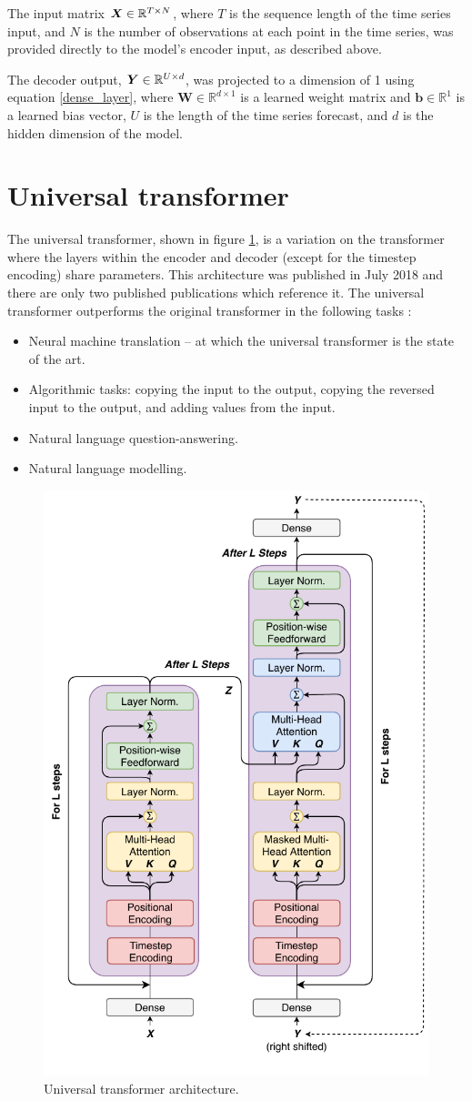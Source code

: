 The input matrix ${\bm{X}} \in \mathbb{R}^{T \times N}$, where $T$ is the sequence length of the time series input, and $N$ is the number of observations at each point in the time series, was provided directly to the model's encoder input, as described above.

The decoder output, ${\bm{Y}} \in \mathbb{R}^{U \times d}$, was projected to a dimension of 1 using equation \ref{dense_layer}, where $\boldsymbol{W} \in \mathbb{R}^{d \times 1}$ is a learned weight matrix and $\boldsymbol{b} \in \mathbb{R}^{1}$ is a learned bias vector, $U$ is the length of the time series forecast, and $d$ is the hidden dimension of the model.

\section{Universal transformer} \label{sec:universal_transformer}
The universal transformer, shown in figure \ref{fig:universal_transformer}, is a variation on the transformer where the layers within the encoder and decoder (except for the timestep encoding) share parameters.
This architecture was published in July 2018 \cite{Dehghani2018} and there are only two published publications which reference it.
The universal transformer outperforms the original transformer in the following tasks \cite{Dehghani2018}:
\begin{itemize}
	\item Neural machine translation -- at which the universal transformer is the state of the art.
	\item Algorithmic tasks: copying the input to the output, copying the reversed input to the output, and adding values from the input.
	\item Natural language question-answering.
	\item Natural language modelling.
\end{itemize}

\begin{figure}[htbp]
	\centerline{\includegraphics[width=.5\textwidth]{images/universal_transformer.pdf}}
	\caption{Universal transformer architecture.}
	\label{fig:universal_transformer}
\end{figure}

